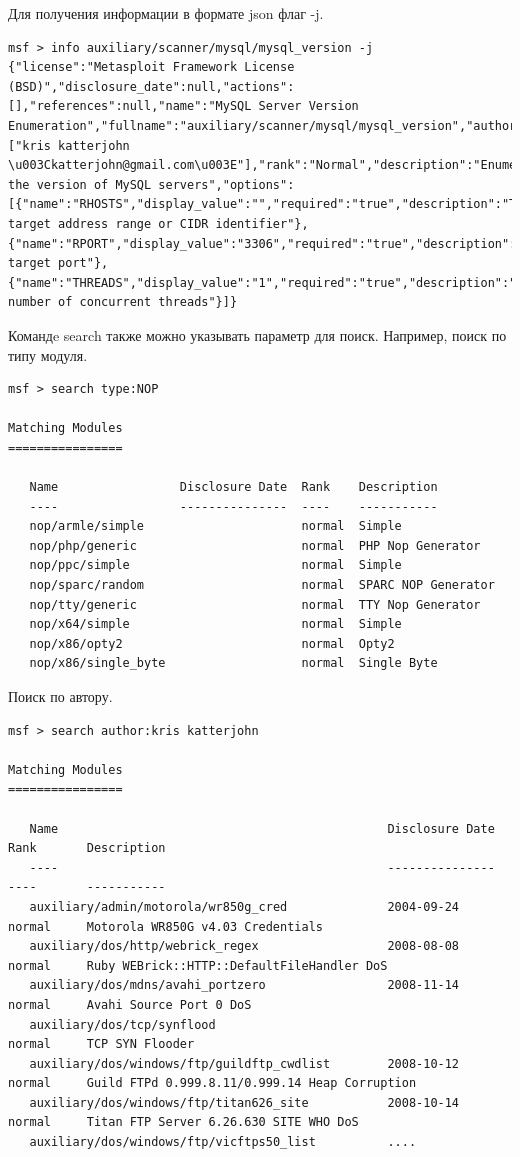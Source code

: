 \documentclass[10pt,a4paper]{report}
\begin{document}
Для получения информации в формате json флаг -j.
\begin{verbatim}
msf > info auxiliary/scanner/mysql/mysql_version -j
{"license":"Metasploit Framework License (BSD)","disclosure_date":null,"actions":[],"references":null,"name":"MySQL Server Version Enumeration","fullname":"auxiliary/scanner/mysql/mysql_version","authors":["kris katterjohn \u003Ckatterjohn@gmail.com\u003E"],"rank":"Normal","description":"Enumerates the version of MySQL servers","options":[{"name":"RHOSTS","display_value":"","required":"true","description":"The target address range or CIDR identifier"},{"name":"RPORT","display_value":"3306","required":"true","description":"The target port"},{"name":"THREADS","display_value":"1","required":"true","description":"The number of concurrent threads"}]}
\end{verbatim}
Командe search также можно указывать параметр для поиск. Например, поиск по типу модуля.
\begin{verbatim}
msf > search type:NOP

Matching Modules
================

   Name                 Disclosure Date  Rank    Description
   ----                 ---------------  ----    -----------
   nop/armle/simple                      normal  Simple
   nop/php/generic                       normal  PHP Nop Generator
   nop/ppc/simple                        normal  Simple
   nop/sparc/random                      normal  SPARC NOP Generator
   nop/tty/generic                       normal  TTY Nop Generator
   nop/x64/simple                        normal  Simple
   nop/x86/opty2                         normal  Opty2
   nop/x86/single_byte                   normal  Single Byte

\end{verbatim}
Поиск по автору.
\begin{verbatim}
msf > search author:kris katterjohn

Matching Modules
================

   Name                                              Disclosure Date  Rank       Description
   ----                                              ---------------  ----       -----------
   auxiliary/admin/motorola/wr850g_cred              2004-09-24       normal     Motorola WR850G v4.03 Credentials
   auxiliary/dos/http/webrick_regex                  2008-08-08       normal     Ruby WEBrick::HTTP::DefaultFileHandler DoS
   auxiliary/dos/mdns/avahi_portzero                 2008-11-14       normal     Avahi Source Port 0 DoS
   auxiliary/dos/tcp/synflood                                         normal     TCP SYN Flooder
   auxiliary/dos/windows/ftp/guildftp_cwdlist        2008-10-12       normal     Guild FTPd 0.999.8.11/0.999.14 Heap Corruption
   auxiliary/dos/windows/ftp/titan626_site           2008-10-14       normal     Titan FTP Server 6.26.630 SITE WHO DoS
   auxiliary/dos/windows/ftp/vicftps50_list          ....

\end{verbatim}
\end{document}
